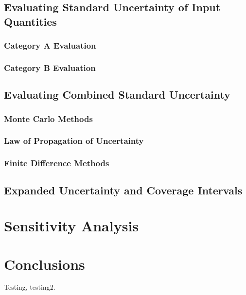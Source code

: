 \documentclass[../thesis.tex]{subfiles}
\begin{document}
\begin{refsection}
\subsection{Evaluating Standard Uncertainty of Input Quantities}

\subsubsection{Category A Evaluation}
\subsubsection{Category B Evaluation}
\subsection{Evaluating Combined Standard Uncertainty}
\subsubsection{Monte Carlo Methods}
\subsubsection{Law of Propagation of Uncertainty}
\subsubsection{Finite Difference Methods}
\subsection{Expanded Uncertainty and Coverage Intervals}
\section{Sensitivity Analysis}
\section{Conclusions}
Testing, testing2\cite{Stant_2017}.
\printbibliography
\end{refsection}
\end{document}
